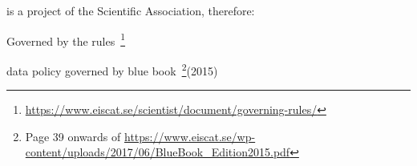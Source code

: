 \begin{frame}[fragile,t]
\vspace{\mytopbit}
\bitm
\item{\ED is a project of the \EC Scientific Association, therefore:}
  \item{Governed by the \EC rules~\footnote{\url{https://www.eiscat.se/scientist/document/governing-rules/}}}
  \item{\EC data policy governed by blue book~\footnote{{Page 39 onwards of} \tiny \url{https://www.eiscat.se/wp-content/uploads/2017/06/BlueBook_Edition2015.pdf}}(2015)}
\eitm
\end{frame}
